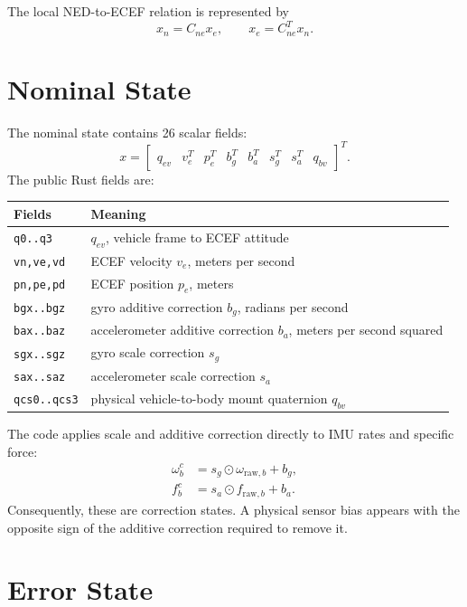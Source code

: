 \documentclass[11pt]{article}
\newcommand{\T}{^{T}}
\begin{document}
The local NED-to-ECEF relation is represented by
\begin{equation}
  x_n=C_{ne}x_e,\qquad x_e=C_{ne}\T x_n .
\end{equation}

\section{Nominal State}

The nominal state contains 26 scalar fields:
\begin{equation}
  x=
  \begin{bmatrix}
  q_{ev} & v_e\T & p_e\T & b_g\T & b_a\T &
  s_g\T & s_a\T & q_{bv}
  \end{bmatrix}\T .
\end{equation}
The public Rust fields are:
\begin{center}
\begin{tabular}{ll}
\toprule
Fields & Meaning \\
\midrule
\texttt{q0..q3} & \(q_{ev}\), vehicle frame to ECEF attitude \\
\texttt{vn,ve,vd} & ECEF velocity \(v_e\), meters per second \\
\texttt{pn,pe,pd} & ECEF position \(p_e\), meters \\
\texttt{bgx..bgz} & gyro additive correction \(b_g\), radians per second \\
\texttt{bax..baz} & accelerometer additive correction \(b_a\), meters per second squared \\
\texttt{sgx..sgz} & gyro scale correction \(s_g\) \\
\texttt{sax..saz} & accelerometer scale correction \(s_a\) \\
\texttt{qcs0..qcs3} & physical vehicle-to-body mount quaternion \(q_{bv}\) \\
\bottomrule
\end{tabular}
\end{center}

The code applies scale and additive correction directly to IMU rates and
specific force:
\begin{align}
  \omega_b^c &= s_g\odot\omega_{\mathrm{raw},b}+b_g,\\
  f_b^c &= s_a\odot f_{\mathrm{raw},b}+b_a.
\end{align}
Consequently, these are correction states. A physical sensor bias appears with
the opposite sign of the additive correction required to remove it.

\section{Error State}
\end{document}
